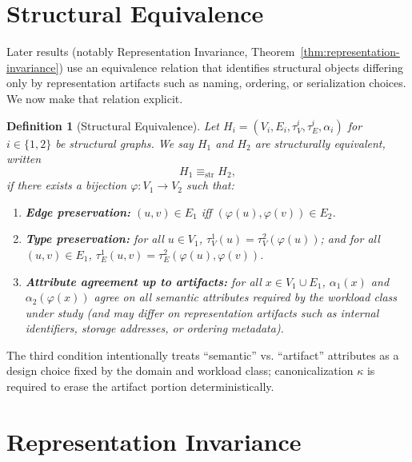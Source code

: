 \documentclass[11pt]{article}
\newtheorem{definition}{Definition}
\begin{document}
\section{Structural Equivalence}
\label{sec:structural-equivalence}

Later results (notably Representation Invariance, Theorem~\ref{thm:representation-invariance}) use an equivalence relation that identifies structural objects differing only by representation artifacts such as naming, ordering, or serialization choices. We now make that relation explicit.

\begin{definition}[Structural Equivalence]
\label{def:structural-equivalence}
Let
\(H_i=(V_i,E_i,\tau^i_V,\tau^i_E,\alpha_i)\) for \(i\in\{1,2\}\) be structural graphs.
We say \(H_1\) and \(H_2\) are \emph{structurally equivalent}, written
\[
H_1 \equiv_{\mathrm{str}} H_2,
\]
if there exists a bijection \(\varphi:V_1\to V_2\) such that:
\begin{enumerate}[label=(\roman*),leftmargin=*]
  \item \textbf{Edge preservation:} \((u,v)\in E_1\) iff \((\varphi(u),\varphi(v))\in E_2\).
  \item \textbf{Type preservation:} for all \(u\in V_1\), \(\tau^1_V(u)=\tau^2_V(\varphi(u))\); and for all \((u,v)\in E_1\),
  \(\tau^1_E(u,v)=\tau^2_E(\varphi(u),\varphi(v))\).
  \item \textbf{Attribute agreement up to artifacts:} for all \(x\in V_1\cup E_1\),
  \(\alpha_1(x)\) and \(\alpha_2(\varphi(x))\) agree on all \emph{semantic} attributes required by the workload class under study (and may differ on representation artifacts such as internal identifiers, storage addresses, or ordering metadata).
\end{enumerate}
\end{definition}

\noindent The third condition intentionally treats ``semantic'' vs.
``artifact'' attributes as a design choice fixed by the domain and workload class; canonicalization $\kappa$ is required to erase the artifact portion deterministically.

\section{Representation Invariance}
\label{sec:representation-invariance}
\end{document}
